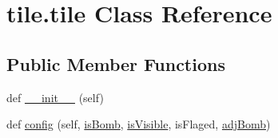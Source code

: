 \hypertarget{classtile_1_1tile}{}\section{tile.\+tile Class Reference}
\label{classtile_1_1tile}
\subsection*{Public Member Functions}
\begin{DoxyCompactItemize}
\item 
def \mbox{\hyperlink{classtile_1_1tile_a8a06fff9b10c8cb32195e21005d9ebc3}{\+\_\+\+\_\+init\+\_\+\+\_\+}} (self)
\item 
def \mbox{\hyperlink{classtile_1_1tile_ad7054ecde560f0a41204a149c806e351}{config}} (self, \mbox{\hyperlink{classtile_1_1tile_a0c5e73514e10b42dfb81b4362b079f07}{is\+Bomb}}, \mbox{\hyperlink{classtile_1_1tile_a9cfb7110e4d0edcee61a9243bf460dc2}{is\+Visible}}, is\+Flaged, \mbox{\hyperlink{classtile_1_1tile_ad8524a450f8196ef6d5711ba050de1a4}{adj\+Bomb}})
\end{DoxyCompactItemize}
